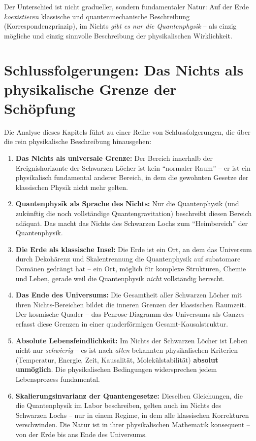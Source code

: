 ﻿\documentclass[12pt,a4paper]{report}
\begin{document}
Der Unterschied ist nicht gradueller, sondern fundamentaler Natur: Auf der Erde \emph{koexistieren} klassische und quantenmechanische Beschreibung (Korrespondenzprinzip), im Nichts \emph{gibt es nur die Quantenphysik} -- als einzig mögliche und einzig sinnvolle Beschreibung der physikalischen Wirklichkeit.


\section{Schlussfolgerungen: Das Nichts als physikalische Grenze der Schöpfung}

Die Analyse dieses Kapitels führt zu einer Reihe von Schlussfolgerungen, die über die rein physikalische Beschreibung hinausgehen:

\begin{enumerate}
    \item \textbf{Das Nichts als universale Grenze:} Der Bereich
    innerhalb der Ereignishorizonte der Schwarzen Löcher ist kein ``normaler Raum'' -- er ist ein
    physikalisch fundamental anderer Bereich, in dem die gewohnten Gesetze der klassischen Physik nicht mehr gelten.

    \item \textbf{Quantenphysik als Sprache des Nichts:} Nur die Quantenphysik (und
    zukünftig die noch vollständige Quantengravitation) beschreibt diesen Bereich adäquat. Das macht das
    Nichts des Schwarzen Lochs zum ``Heimbereich'' der Quantenphysik.

    \item \textbf{Die Erde als klassische Insel:} Die Erde ist ein Ort, an dem das Universum durch Dekohärenz und
    Skalentrennung die Quantenphysik auf subatomare Domänen gedrängt hat -- ein Ort, möglich
    für komplexe Strukturen, Chemie und Leben, gerade weil die Quantenphysik \emph{nicht} vollständig herrscht.

    \item \textbf{Das Ende des Universums:} Die Gesamtheit aller Schwarzen Löcher mit ihren Nichts-Bereichen
    bildet die inneren Grenzen der klassischen Raumzeit. Der kosmische Quader -- das Penrose-Diagramm des Universums als Ganzes --
    erfasst diese Grenzen in einer quaderförmigen Gesamt-Kausalstruktur.

    \item \textbf{Absolute Lebensfeindlichkeit:} Im Nichts der Schwarzen Löcher ist Leben nicht nur \emph{schwierig} --
    es ist nach \emph{allen} bekannten physikalischen Kriterien (Temperatur, Energie, Zeit, Kausalität, Molekülstabilität)
    \textbf{absolut unmöglich}. Die physikalischen Bedingungen widersprechen jedem Lebensprozess fundamental.

    \item \textbf{Skalierungsinvarianz der Quantengesetze:} Dieselben Gleichungen, die die Quantenphysik
    im Labor beschreiben, gelten auch im Nichts des Schwarzen Lochs -- nur in einem Regime, in dem
    alle klassischen Korrekturen verschwinden. Die Natur ist in ihrer physikalischen Mathematik
    konsequent -- von der Erde bis ans Ende des Universums.
\end{enumerate}
\end{document}
